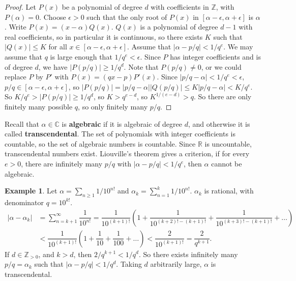 \documentclass{article}
\newcommand{\Z}{\mathbb{Z}}
\newcommand{\R}{\mathbb{R}}
\newcommand{\C}{\mathbb{C}}
\newcommand{\rb}[1]{\left( #1 \right)}
\renewcommand{\sb}[1]{\left[ #1 \right]}
\newcommand{\abs}[1]{\left\lvert #1 \right\rvert}
\theoremstyle{definition}\newtheorem{definition}{Definition}
\theoremstyle{definition}\newtheorem{remark}[definition]{Remark}
\theoremstyle{definition}\newtheorem*{example}{Example}
\theoremstyle{definition}\newtheorem*{note}{Note}
\begin{document}
\begin{proof}
Let $ P\rb{x} $ be a polynomial of degree $ d $ with coefficients in $ \Z $, with $ P\rb{\alpha} = 0 $. Choose $ \epsilon > 0 $ such that the only root of $ P\rb{x} $ in $ \sb{\alpha - \epsilon, \alpha + \epsilon} $ is $ \alpha $. Write $ P\rb{x} = \rb{x - \alpha}Q\rb{x} $. $ Q\rb{x} $ is a polynomial of degree $ d - 1 $ with real coefficients, so in particular it is continuous, so there exists $ K $ such that $ \abs{Q\rb{x}} \le K $ for all $ x \in \sb{\alpha - \epsilon, \alpha + \epsilon} $. Assume that $ \abs{\alpha - p / q} < 1 / q^e $. We may assume that $ q $ is large enough that $ 1 / q^e < \epsilon $. Since $ P $ has integer coefficients and is of degree $ d $, we have $ \abs{P\rb{p / q}} \ge 1 / q^d $. Note that $ P\rb{p / q} \ne 0 $, or we could replace $ P $ by $ P' $ with $ P\rb{x} = \rb{qx - p}P'\rb{x} $. Since $ \abs{p / q - \alpha} < 1 / q^e < \epsilon $, $ p / q \in \sb{\alpha - \epsilon, \alpha + \epsilon} $, so $ \abs{P\rb{p / q}} = \abs{p / q - \alpha} \abs{Q\rb{p / q}} \le K \abs{p / q - \alpha} < K / q^e $. So $ K / q^e > \abs{P\rb{p / q}} \ge 1 / q^d $, so $ K > q^{e - d} $, so $ K^{1 / \rb{e - d}} > q $. So there are only finitely many possible $ q $, so only finitely many $ p / q $.
\end{proof}

Recall that $ \alpha \in \C $ is \textbf{algebraic} if it is algebraic of degree $ d $, and otherwise it is called \textbf{transcendental}. The set of polynomials with integer coefficients is countable, so the set of algebraic numbers is countable. Since $ \R $ is uncountable, transcendental numbers exist. Liouville's theorem gives a criterion, if for every $ e > 0 $, there are infinitely many $ p / q $ with $ \abs{\alpha - p / q} < 1 / q^e $, then $ \alpha $ cannot be algebraic.

\begin{example}
Let $ \alpha = \sum_{n \ge 1} 1 / 10^{n!} $ and $ \alpha_k = \sum_{n = 1}^k 1 / 10^{n!} $. $ \alpha_k $ is rational, with denominator $ q = 10^{k!} $.
\begin{align*}
\abs{\alpha - \alpha_k}
& = \sum_{n = k + 1}^\infty \dfrac{1}{10^{n!}}
= \dfrac{1}{10^{\rb{k + 1}!}}\rb{1 + \dfrac{1}{10^{\rb{k + 2}! - \rb{k + 1}!}} + \dfrac{1}{10^{\rb{k + 3}! - \rb{k + 1}!}} + \dots} \\
& < \dfrac{1}{10^{\rb{k + 1}!}}\rb{1 + \dfrac{1}{10} + \dfrac{1}{100} + \dots}
< \dfrac{2}{10^{\rb{k + 1}!}}
= \dfrac{2}{q^{k + 1}}.
\end{align*}
If $ d \in \Z_{> 0} $, and $ k > d $, then $ 2 / q^{k + 1} < 1 / q^d $. So there exists infinitely many $ p / q = \alpha_k $ such that $ \abs{\alpha - p / q} < 1 / q^d $. Taking $ d $ arbitrarily large, $ \alpha $ is transcendental.
\end{example}
\end{document}
